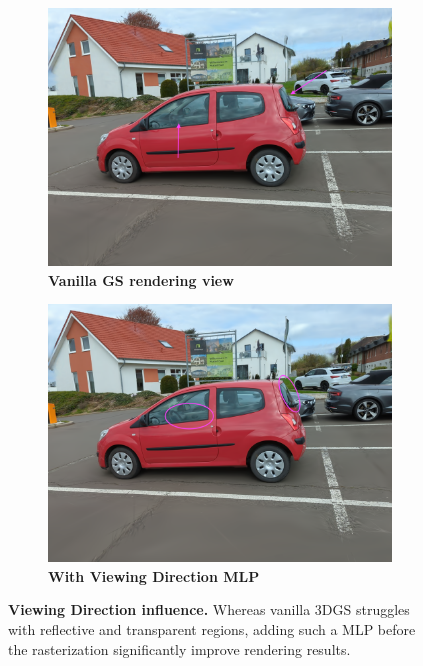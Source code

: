 \begin{figure}[htb!]
  \centering
  \begin{subfigure}[b]{0.48\linewidth}
    \includegraphics[width=\linewidth]{images/gaussiansplatting/00023-gs.png}
    \caption{\textbf{Vanilla GS rendering view}}
    \label{fig:view3}
  \end{subfigure}
  \quad %
  \begin{subfigure}[b]{0.48\linewidth}
    \includegraphics[width=\linewidth]{images/gaussiansplatting/00023-gs-vd.png}
    \caption{\textbf{With Viewing Direction MLP}}
    \label{fig:gs-view3-gs}
  \end{subfigure}
  \caption{\textbf{Viewing Direction influence.} Whereas vanilla 3D\ac{GS} struggles with reflective and transparent regions, adding such a \ac{MLP} before the rasterization significantly improve rendering results. }
  \label{fig:gs-vh}
\end{figure}


